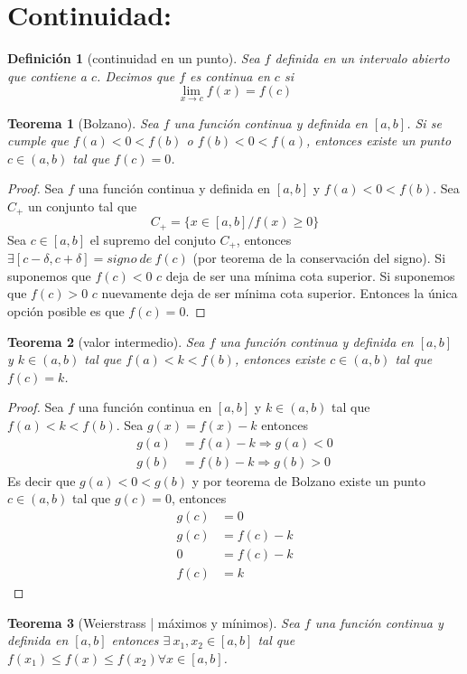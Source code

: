 \documentclass{report}
\newtheorem*{theorem}{Teorema}
\newtheorem*{definition}{Definición}
\begin{document}
  \chapter*{Continuidad:}
    \begin{definition}[continuidad en un punto]
      Sea $f$ definida en un intervalo abierto que contiene a $c$. Decimos que $f$ es 
      continua en $c$ si
      \begin{equation*}
        \lim_{x\to c}f(x)=f(c)
      \end{equation*}
    \end{definition}
    \begin{theorem}[Bolzano]
      Sea $f$ una función continua y definida en $[a,b]$. Si se cumple que $f(a)<0<f(b)$ o 
      $f(b)<0<f(a)$, entonces existe un punto $c\in(a,b)$ tal que $f(c)=0$.
    \end{theorem}
    \begin{proof}
      Sea $f$ una función continua y definida en $[a,b]$ y $f(a)<0<f(b)$. Sea $C_+$ un
      conjunto tal que
      \begin{equation*}
        C_+=\{x\in[a,b]/f(x)\geqslant0\}
      \end{equation*}
      Sea $c\in[a,b]$ el supremo del conjuto $C_+$, entonces $\exists[c-\delta,c+\delta]=
      signo\ de\ f(c)$ (por teorema de la conservación del signo). Si suponemos que $f(c)<0$
      $c$ deja de ser una mínima cota superior. Si suponemos que $f(c)>0$ $c$ nuevamente deja
      de ser mínima cota superior. Entonces la única opción posible es que $f(c)=0$.
    \end{proof}
    \begin{theorem}[valor intermedio]
      Sea $f$ una función continua y definida en $[a,b]$ y $k\in(a,b)$ tal que $f(a)<k<f(b)$,
      entonces existe $c\in(a,b)$ tal que $f(c)=k$.
    \end{theorem}
    \begin{proof}
      Sea $f$ una función continua en $[a,b]$ y $k\in(a,b)$ tal que $f(a)<k<f(b)$. Sea
      $g(x)=f(x)-k$ entonces
      \begin{align*}
        g(a)&=f(a)-k\Longrightarrow g(a)<0\\
        g(b)&=f(b)-k\Longrightarrow g(b)>0
      \end{align*}
      Es decir que $g(a)<0<g(b)$ y por teorema de Bolzano existe un punto 
      $c\in(a,b)$ tal que $g(c)=0$, entonces
      \begin{align*}
        g(c)&=0\\
        g(c)&=f(c)-k\\
        0&=f(c)-k\\
        f(c)&=k
      \end{align*}
    \end{proof}
    \begin{theorem}[Weierstrass | máximos y mínimos]
      Sea $f$ una función continua y definida en $[a,b]$ entonces $\exists\ x_1,x_2\in[a,b]$ 
      tal que $f(x_1)\leqslant f(x)\leqslant f(x_2)\forall x\in[a,b]$.
    \end{theorem}
\end{document}
